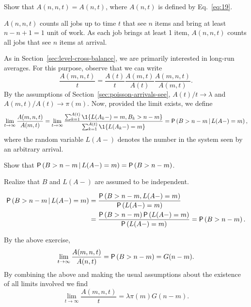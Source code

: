 \begin{exercise}
   Show that $A(n, n,t) = A(n,t)$, where $A(n,t)$ is defined by Eq.~\ref{eq:19}.
\begin{solution}
 $A(n,n,t)$ counts all jobs up to time $t$ that see $n$ items
    and bring at least $n-n+1=1$ unit of work. As each job brings at
    least 1 item, $A(n,n,t)$ counts all jobs that see $n$ items at
    arrival.
\end{solution}
\end{exercise}

As in Section~\ref{sec:level-cross-balance}, we are primarily interested in  long-run averages. For this purpose, observe that we can write
\begin{equation}\label{eq:16}
  \frac{A(m,n,t)}t =   \frac{A(t)}t \frac{A(m,t)}{A(t)}\frac{A(m,n,t)}{A(m,t)}.
\end{equation}
By the assumptions of Section~\ref{sec:poisson-arrivals-see},  $A(t)/t\to\lambda$ and $A(m,t)/A(t)\to\pi(m)$.  Now, provided the limit exists, we define
\begin{equation}\label{eq:1332}
\lim_{t\to\infty} \frac{A(m,n,t)}{A(m,t)} = 
\lim_{t\to\infty} \frac{\sum_{k=1}^{A(t)}\1{L(A_k-) = m, B_k > n-m}}
{\sum_{k=1}^{A(t)}\1{L(A_k-) = m}}=\P{B>n-m\given L(A-)=m},
\end{equation}
where the random variable $L(A-)$   denotes the number in the system seen by an arbitrary arrival.

\begin{exercise}
Show that $\P{B>n-m\given L(A-)=m}=\P{B>n-m}$.
\begin{solution}
  \begin{hint}
    Realize that $B$ and $L(A-)$ are assumed to be independent.
  \end{hint}
\begin{equation*}
  \begin{split}
\P{B>n-m\given L(A-)=m} &=
\frac{\P{B>n-m,L(A-)=m}}{\P{L(A-)=m}}\\
&=\frac{\P{B>n-m}\P{L(A-)=m}}{\P{L(A-)=m}} = \P{B>n-m}.
  \end{split}
\end{equation*}
\end{solution}
\end{exercise}

By the above exercise,
\begin{equation*}
\lim_{t\to\infty} \frac{A(m,n,t)}{A(n,t)} = \P{B>n-m} = G(n-m).
\end{equation*} 
By combining the above and making the usual assumptions about the
existence of all limits involved we find
\begin{equation*}
\lim_{t\to\infty}   \frac{A(m,n,t)}t = \lambda \pi(m) G(n-m).
\end{equation*}

